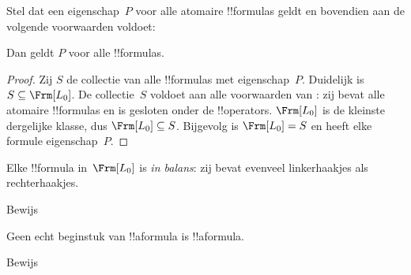 \documentclass[../../../include/open-logic-section]{subfiles}
\begin{document}


\begin{thm}
  Stel dat een eigenschap~$P$ voor alle atomaire !!{formula}s geldt en
  bovendien aan de volgende voorwaarden voldoet:
  \begin{enumerate}
  \end{enumerate}
  Dan geldt $P$ voor alle !!{formula}s.
\end{thm}

\begin{proof}
  Zij $S$ de collectie van alle !!{formula}s met eigenschap~$P$.
  Duidelijk is $S \subseteq \Frm[L_0]$. De collectie~$S$ voldoet aan
  alle voorwaarden van : zij bevat alle
  atomaire !!{formula}s en is gesloten onder de !!{operator}s.
  $\Frm[L_0]$ is de kleinste dergelijke klasse, dus
  $\Frm[L_0] \subseteq S$. Bijgevolg is $\Frm[L_0] = S$ en heeft elke
  formule eigenschap~$P$.
\end{proof}

\begin{prop}
   Elke !!{formula} in~$\Frm[L_0]$ is \emph{in balans}: zij bevat
   evenveel linkerhaakjes als rechterhaakjes.
\end{prop}

\begin{prob}
Bewijs 
\end{prob}

\begin{prop} 
Geen echt beginstuk van !!a{formula} is !!a{formula}.
\end{prop}

\begin{prob}
  Bewijs 
\end{prob}
\end{document}
